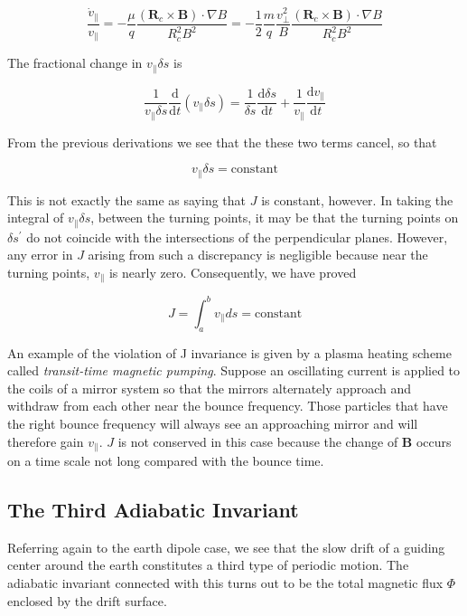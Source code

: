 \documentclass[
  notoc %
]{tufte-book}
\begin{document}
\[
\frac{\dot{v}_\parallel}{v_\parallel} = -\frac{\mu}{q}\frac{(\mathbf{R}_c\times\mathbf{B})\cdot\nabla B}{R_c^2 B^2} = -\frac{1}{2}\frac{m}{q}\frac{v_\perp^2}{B} \frac{(\mathbf{R}_c\times\mathbf{B})\cdot\nabla B}{R_c^2 B^2}
\]

The fractional change in \(v_\parallel \delta s\) is

\[
\frac{1}{v_\parallel \delta s}\frac{\mathrm{d}}{\mathrm{d}t}(v_\parallel \delta s) = \frac{1}{\delta s}\frac{\mathrm{d}\delta s}{\mathrm{d}t} + \frac{1}{v_\parallel}\frac{\mathrm{d}v_\parallel}{\mathrm{d}t}
\]

From the previous derivations we see that the these two terms cancel, so
that

\[
v_\parallel \delta s = \textrm{constant}
\]

This is not exactly the same as saying that \(J\) is constant, however.
In taking the integral of \(v_\parallel \delta s\), between the turning
points, it may be that the turning points on \(\delta s^\prime\) do not
coincide with the intersections of the perpendicular planes. However,
any error in \(J\) arising from such a discrepancy is negligible because
near the turning points, \(v_\parallel\) is nearly zero. Consequently,
we have proved

\[
J = \int_a^b v_\parallel ds = \textrm{constant}
\]

An example of the violation of J invariance is given by a plasma heating
scheme called \emph{transit-time magnetic pumping}. Suppose an
oscillating current is applied to the coils of a mirror system so that
the mirrors alternately approach and withdraw from each other near the
bounce frequency. Those particles that have the right bounce frequency
will always see an approaching mirror and will therefore gain
\(v_\parallel\). \(J\) is not conserved in this case because the change
of \(\mathbf{B}\) occurs on a time scale not long compared with the
bounce time.

\hypertarget{the-third-adiabatic-invariant}{%
\subsection{The Third Adiabatic
Invariant}\label{the-third-adiabatic-invariant}}

Referring again to the earth dipole case, we see that the slow drift of
a guiding center around the earth constitutes a third type of periodic
motion. The adiabatic invariant connected with this turns out to be the
total magnetic flux \(\Phi\) enclosed by the drift surface.
\end{document}
